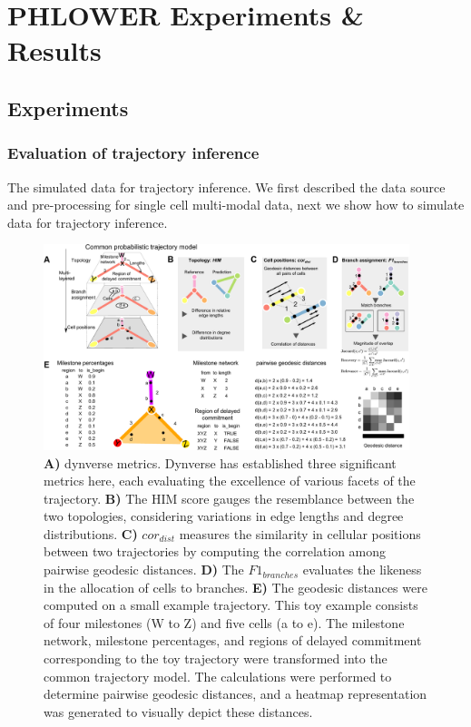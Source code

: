\chapter{PHLOWER Experiments \& Results}
\label{chapter:PHLOWER_bench}

\graphicspath{{chapter6/figs}}

\section{Experiments}
\subsection{Evaluation of trajectory inference}
The simulated data for trajectory inference. We first described the data source and pre-processing for single cell multi-modal data, next we show how to simulate data for trajectory inference.
\begin{figure}[!ht]
	\centering
	\includegraphics[width=0.95\textwidth]{dynverse_metrics/fig}
	\vspace{0.1cm}
	\caption[Dynverse metrics]{ \textbf{A)} dynverse metrics. Dynverse has established three significant metrics here, each evaluating the excellence of various facets of the trajectory. \textbf{B)} The HIM score gauges the resemblance between the two topologies, considering variations in edge lengths and degree distributions. \textbf{C)} $cor_{dist}$ measures the similarity in cellular positions between two trajectories by computing the correlation among pairwise geodesic distances. \textbf{D)} The $F1_{branches}$ evaluates the likeness in the allocation of cells to branches. \textbf{E)} The geodesic distances were computed on a small example trajectory. This toy example consists of four milestones (W to Z) and five cells (a to e). The milestone network, milestone percentages, and regions of delayed commitment corresponding to the toy trajectory were transformed into the common trajectory model. The calculations were performed to determine pairwise geodesic distances, and a heatmap representation was generated to visually depict these distances.}
	\label{fig:dynverse_metrics}
\end{figure}

